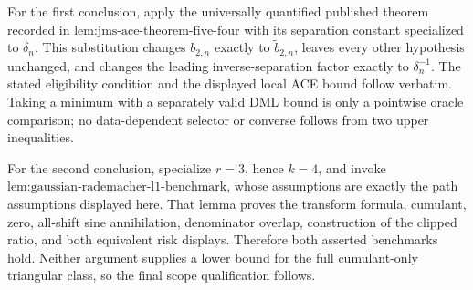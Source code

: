 For the first conclusion, apply the universally quantified published theorem recorded in \(\text{lem:jms-ace-theorem-five-four}\) with its separation constant specialized to \(\delta_n\).  This substitution changes \(b_{2,n}\) exactly to \(\widetilde b_{2,n}\), leaves every other hypothesis unchanged, and changes the leading inverse-separation factor exactly to \(\delta_n^{-1}\).  The stated eligibility condition and the displayed local ACE bound follow verbatim.  Taking a minimum with a separately valid DML bound is only a pointwise oracle comparison; no data-dependent selector or converse follows from two upper inequalities.

For the second conclusion, specialize \(r=3\), hence \(k=4\), and invoke \(\text{lem:gaussian-rademacher-l1-benchmark}\), whose assumptions are exactly the path assumptions displayed here.  That lemma proves the transform formula, cumulant, zero, all-shift sine annihilation, denominator overlap, construction of the clipped ratio, and both equivalent risk displays.  Therefore both asserted benchmarks hold.  Neither argument supplies a lower bound for the full cumulant-only triangular class, so the final scope qualification follows.